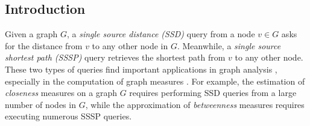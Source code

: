 \documentclass{sig-alternate}
\def\r{\alpha}
\begin{document}
\begin{sloppy}
\begin{abstract}
%
\end{abstract}



\section{Introduction} \label{sec:intro}


Given a graph $G$, a {\em single source distance (SSD)} query from a node $v \in G$ asks for the distance from $v$ to any other node in $G$. Meanwhile, a {\em single source shortest path (SSSP)} query retrieves the shortest path from $v$ to any other node. These two types of queries find important applications in graph analysis \cite{ckcc12}, especially in the computation of graph measures \cite{acim99,bkmm07,ew04,tk11}. For example, the estimation of {\em closeness} measures \cite{ew04} on a graph $G$ requires performing SSD queries from a large number of nodes in $G$, while the approximation of {\em betweenness} measures \cite{bkmm07} requires executing numerous SSSP queries.


\end{sloppy}
\end{document}
